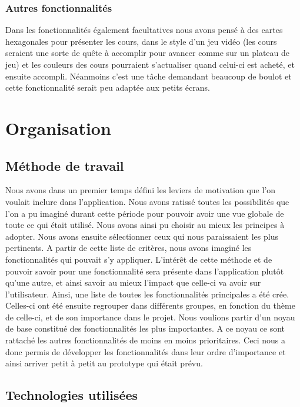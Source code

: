 \documentclass[pidr]{tnreport}
\begin{document}
\subsection{Autres fonctionnalités}

Dans les fonctionnalités également facultatives nous avons pensé à des cartes hexagonales pour présenter les cours, dans le style d’un jeu vidéo (les cours seraient une sorte de quête à accomplir pour avancer comme sur un plateau de jeu) et les couleurs des cours pourraient s’actualiser quand celui-ci est acheté, et ensuite accompli. Néanmoins c’est une tâche demandant beaucoup de boulot et cette fonctionnalité serait peu adaptée aux petits écrans.

\chapter{Organisation}

\section{Méthode de travail}

Nous avons dans un premier temps défini les leviers de motivation que l’on voulait inclure dans l’application. Nous avons ratissé toutes les possibilités que l’on a pu imaginé durant cette période pour pouvoir avoir une vue globale de toute ce qui était utilisé. Nous avons ainsi pu choisir au mieux les principes à adopter. Nous avons ensuite sélectionner ceux qui nous paraissaient les plus pertinents. A partir de cette liste de critères, nous avons imaginé les fonctionnalités qui pouvait s’y appliquer. L'intérêt de cette méthode et de pouvoir savoir pour une fonctionnalité sera présente dans l’application plutôt qu’une autre, et ainsi savoir au mieux l’impact que celle-ci va avoir sur l’utilisateur. Ainsi, une liste de toutes les fonctionnalités principales a été crée. Celles-ci ont été ensuite regrouper dans différents groupes, en fonction du thème de celle-ci, et de son importance dans le projet. Nous voulions partir d’un noyau de base constitué des fonctionnalités les plus importantes. A ce noyau ce sont rattaché les autres fonctionnalités de moins en moins prioritaires. Ceci nous a donc permis de développer les fonctionnalités dans leur ordre d’importance et ainsi arriver petit à petit au prototype qui était prévu.

\section{Technologies utilisées}
\end{document}
